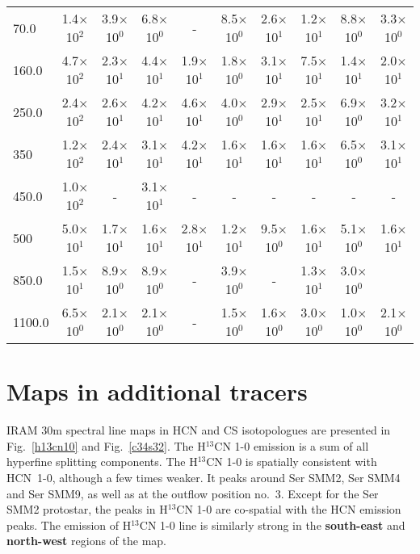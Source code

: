 \documentclass{aa}
\begin{document}
\begin{appendix}
\begin{table*}
\begin{tabular}{l c c c c c c c c c}
70.0 & 1.4$\times$10$^{2}$ & 3.9$\times$10$^{0}$ & 6.8$\times$10$^{0}$ & - & 8.5$\times$10$^{0}$ & 2.6$\times$10$^{1}$ & 1.2$\times$10$^{1}$ & 8.8$\times$10$^{0}$ & 3.3$\times$10$^{0}$\\
160.0 & 4.7$\times$10$^{2}$ & 2.3$\times$10$^{1}$ & 4.4$\times$10$^{1}$ & 1.9$\times$10$^{1}$ & 1.8$\times$10$^{0}$ & 3.1$\times$10$^{1}$ & 7.5$\times$10$^{1}$ & 1.4$\times$10$^{1}$ & 2.0$\times$10$^{1}$\\
250.0 &  2.4$\times$10$^{2}$ & 2.6$\times$10$^{1}$ & 4.2$\times$10$^{1}$ & 4.6$\times$10$^{1}$ & 4.0$\times$10$^{0}$ & 2.9$\times$10$^{1}$ & 2.5$\times$10$^{1}$ & 6.9$\times$10$^{0}$ & 3.2$\times$10$^{1}$\\
350 & 1.2$\times$10$^{2}$ & 2.4$\times$10$^{1}$ & 3.1$\times$10$^{1}$ & 4.2$\times$10$^{1}$ & 1.6$\times$10$^{1}$ & 1.6$\times$10$^{1}$ & 1.6$\times$10$^{1}$ & 6.5$\times$10$^{0}$ & 3.1$\times$10$^{1}$\\
450.0 & 1.0$\times$10$^{2}$ &-  & 3.1$\times$10$^{1}$ &- &- &- &- &- &-\\
500 & 5.0$\times$10$^{1}$ & 1.7$\times$10$^{1}$ & 1.6$\times$10$^{1}$ & 2.8$\times$10$^{1}$ & 1.2$\times$10$^{1}$ & 9.5$\times$10$^{0}$ & 1.6$\times$10$^{1}$ & 5.1$\times$10$^{0}$ & 1.6$\times$10$^{1}$\\
850.0 & 1.5$\times$10$^{1}$ & 8.9$\times$10$^{0}$ & 8.9$\times$10$^{0}$ & - & 3.9$\times$10$^{0}$ & - & 1.3$\times$10$^{1}$ & 3.0$\times$10$^{0}$ &\\
1100.0 & 6.5$\times$10$^{0}$ & 2.1$\times$10$^{0}$ & 2.1$\times$10$^{0}$ & - & 1.5$\times$10$^{0}$ & 1.6$\times$10$^{0}$ & 3.0$\times$10$^{0}$ & 1.0$\times$10$^{0}$ & 2.1$\times$10$^{0}$\\
\hline \end{tabular} 
\end{table*}

\section{Maps in additional tracers}
\label{app:maps}

IRAM 30m spectral line maps in HCN and CS isotopologues are presented in Fig.~\ref{h13cn10} and Fig.~\ref{c34s32}. The H$^{13}$CN 1-0 emission is a sum of all hyperfine splitting components. The H$^{13}$CN 1-0 is spatially consistent with \mbox{HCN 1-0}, although a few times weaker. It peaks around Ser SMM2, Ser SMM4 and Ser SMM9, as well as at the outflow position no.~3. Except for the Ser SMM2 protostar, the peaks in H$^{13}$CN 1-0 are co-spatial with the HCN emission peaks. The emission of H$^{13}$CN 1-0 line is similarly strong in the \textbf{south-east} and \textbf{north-west} regions of the map.


\end{appendix}
\end{document}
